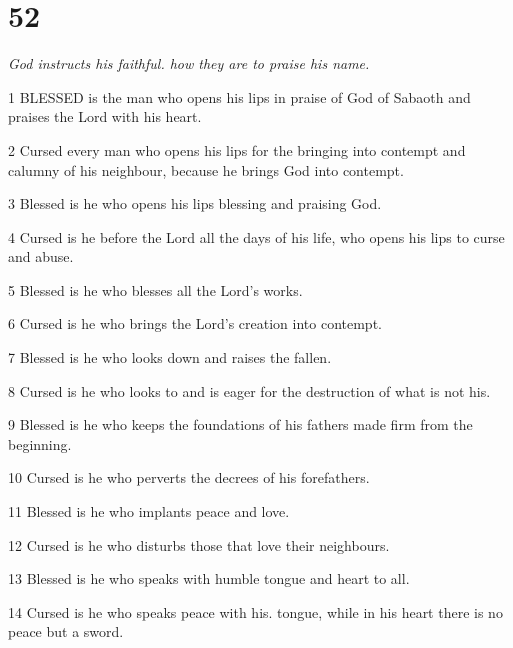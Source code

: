 \chapter{52}

\par \textit{God instructs his faithful. how they are to praise his name.}

\par 1 BLESSED is the man who opens his lips in praise of God of Sabaoth and praises the Lord with his heart.

\par 2 Cursed every man who opens his lips for the bringing into contempt and calumny of his neighbour, because he brings God into contempt.

\par 3 Blessed is he who opens his lips blessing and praising God.

\par 4 Cursed is he before the Lord all the days of his life, who opens his lips to curse and abuse.

\par 5 Blessed is he who blesses all the Lord's works.

\par 6 Cursed is he who brings the Lord's creation into contempt.

\par 7 Blessed is he who looks down and raises the fallen.

\par 8 Cursed is he who looks to and is eager for the destruction of what is not his.

\par 9 Blessed is he who keeps the foundations of his fathers made firm from the beginning.

\par 10 Cursed is he who perverts the decrees of his forefathers.

\par 11 Blessed is he who implants peace and love.

\par 12 Cursed is he who disturbs those that love their neighbours.

\par 13 Blessed is he who speaks with humble tongue and heart to all.

\par 14 Cursed is he who speaks peace with his. tongue, while in his heart there is no peace but a sword.

